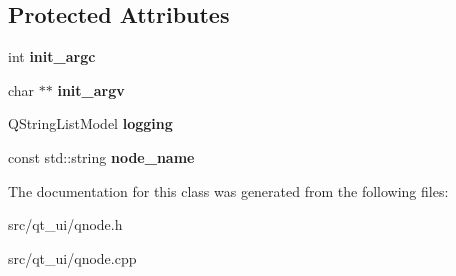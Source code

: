 \subsection*{Protected Attributes}
\begin{DoxyCompactItemize}
\item 
int {\bfseries init\+\_\+argc}\hypertarget{class_q_node_aa0c7569195d8b9a6e568e98097f11d52}{}\label{class_q_node_aa0c7569195d8b9a6e568e98097f11d52}

\item 
char $\ast$$\ast$ {\bfseries init\+\_\+argv}\hypertarget{class_q_node_a92c2972e3dd2a5de95d0edf8c75e1e5f}{}\label{class_q_node_a92c2972e3dd2a5de95d0edf8c75e1e5f}

\item 
Q\+String\+List\+Model {\bfseries logging}\hypertarget{class_q_node_aff2207dadd447d4c2554df19b6f7ce48}{}\label{class_q_node_aff2207dadd447d4c2554df19b6f7ce48}

\item 
const std\+::string {\bfseries node\+\_\+name}\hypertarget{class_q_node_ae2a04cf101323be1e9b2be1e63a03b7f}{}\label{class_q_node_ae2a04cf101323be1e9b2be1e63a03b7f}

\end{DoxyCompactItemize}


The documentation for this class was generated from the following files\+:\begin{DoxyCompactItemize}
\item 
src/qt\+\_\+ui/qnode.\+h\item 
src/qt\+\_\+ui/qnode.\+cpp\end{DoxyCompactItemize}
